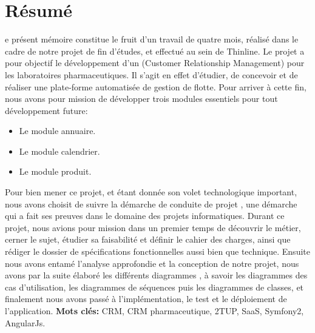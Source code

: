 
\chapter*{Résumé}
\begin{singlespace}
e présent mémoire constitue le fruit d’un travail de quatre mois, réalisé dans le cadre de notre projet de fin d’études, et effectué au sein de Thinline. Le projet a pour objectif le développement d'un  (Customer Relationship Management) pour les laboratoires pharmaceutiques.
\newline
\newline
Il s'agit en effet d'étudier, de concevoir et de réaliser une plate-forme automatisée de gestion de flotte. Pour arriver à cette fin, nous avons pour mission de développer trois modules essentiels pour tout développement future:

    \begin{itemize}
        \item Le module annuaire.
        \item Le module calendrier.
        \item Le module produit.
    \end{itemize}

\noindent Pour bien mener ce projet, et étant donnée son volet technologique important, nous avons choisit de suivre la démarche de conduite de projet , une démarche qui a fait ses preuves dans le domaine des projets informatiques.
\newline
\newline
Durant ce projet, nous avions pour mission dans un premier temps de découvrir le métier,  cerner le sujet, étudier sa faisabilité et définir le cahier des charges, ainsi que rédiger le dossier de spécifications fonctionnelles aussi bien que technique. Ensuite nous avons entamé l’analyse approfondie et la conception de notre projet, nous avons par la suite élaboré les différents diagrammes , à savoir les diagrammes des cas d’utilisation, les diagrammes de séquences puis les diagrammes de classes, et finalement nous avons passé à l’implémentation, le test et le déploiement de l’application.
\vfill{\textbf{Mots clés:} CRM, CRM pharmaceutique, 2TUP, SaaS, Symfony2, AngularJs.}
\end{singlespace}